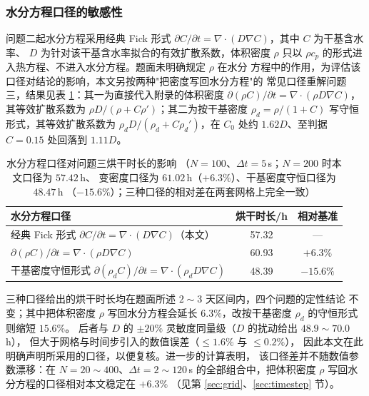 \documentclass[12pt,a4paper,fontset=none]{ctexart}
\begin{document}
\subsubsection{水分方程口径的敏感性}

问题二起水分方程采用经典 Fick 形式
$\partial C/\partial t=\nabla\!\cdot\!(D\nabla C)$，其中 $C$ 为干基含水率、
$D$ 为针对该干基含水率拟合的有效扩散系数，体积密度 $\rho$ 只以
$\rho c_p$ 的形式进入热方程、不进入水分方程。题面未明确规定 $\rho$ 在水分
方程中的作用，为评估该口径对结论的影响，本文另按两种"把密度写回水分方程"的
常见口径重解问题三，结果见表 \ref{tab:clos}：其一为直接代入附录的体积密度
$\partial(\rho C)/\partial t=\nabla\!\cdot\!(\rho D\nabla C)$，
其等效扩散系数为 $\rho D/(\rho+C\rho')$；其二为按干基密度
$\rho_d=\rho/(1+C)$ 写守恒形式，其等效扩散系数为
$\rho_dD/(\rho_d+C\rho_d')$，在 $C_0$ 处约 $1.62D$、至判据
$C=0.15$ 处回落到 $1.11D$。

\begin{table}[htbp]
  \centering
  \caption{水分方程口径对问题三烘干时长的影响
    （$N=100$、$\Delta t=5$\,s；$N=200$ 时本文口径为 $57.42$\,h、
    变密度口径为 $61.02$\,h（$+6.3\%$）、干基密度守恒口径为 $48.47$\,h
    （$-15.6\%$）；三种口径的相对差在两套网格上完全一致）}
  \label{tab:clos}
  \small
  \begin{tabular}{lcc}
    \toprule
    水分方程口径 & 烘干时长/h & 相对基准 \\
    \midrule
    经典 Fick 形式 $\partial C/\partial t=\nabla\!\cdot\!(D\nabla C)$（本文）
      & 57.32 & --- \\
    $\partial(\rho C)/\partial t=\nabla\!\cdot\!(\rho D\nabla C)$
      & 60.93 & $+6.3\%$ \\
    干基密度守恒形式
      $\partial(\rho_dC)/\partial t=\nabla\!\cdot\!(\rho_dD\nabla C)$
      & 48.39 & $-15.6\%$ \\
    \bottomrule
  \end{tabular}
\end{table}

三种口径给出的烘干时长均在题面所述 $2\sim3$ 天区间内，四个问题的定性结论
不变；其中把体积密度 $\rho$ 写回水分方程会延长 $6.3\%$，改按干基密度
$\rho_d$ 的守恒形式则缩短 $15.6\%$。
后者与 $D$ 的 $\pm20\%$ 灵敏度同量级（$D$ 的扰动给出 $48.9\sim70.0$\,h），
但大于网格与时间步引入的数值误差（$\le1.6\%$ 与 $\le0.2\%$），
因此本文在此明确声明所采用的口径，以便复核。进一步的计算表明，
该口径差并不随数值参数漂移：在 $N=20\sim400$、$\Delta t=2\sim120$\,s
的全部组合中，把体积密度 $\rho$ 写回水分方程的口径相对本文稳定在 $+6.3\%$
（见第 \ref{sec:grid}、\ref{sec:timestep} 节）。
\end{document}
